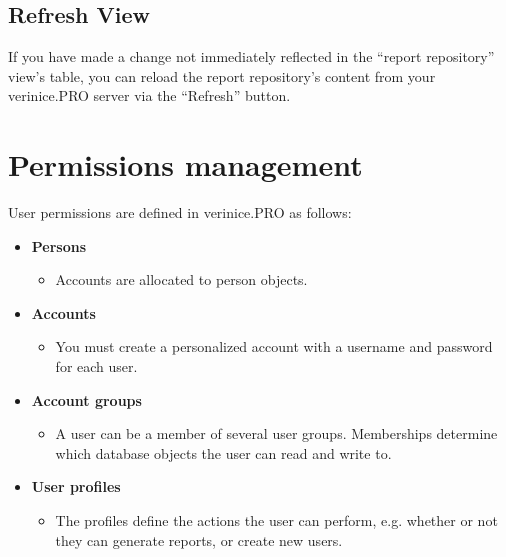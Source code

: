\documentclass[a4paper,10pt]{book}
\begin{document}
\subsection {Refresh View}

If you have made a change not immediately reflected in the ``report
repository'' view's table, you can reload the report repository's
content from your verinice.PRO server via the ``Refresh'' button.

\section{Permissions management} \label{sec:permissions-management}
User permissions are defined in verinice.PRO as follows:
\begin{itemize}
\item \textbf{Persons}
  \begin{itemize}
	\item Accounts are allocated to person objects.
   \end{itemize}
\item \textbf{Accounts}
  \begin{itemize}
   \item You must create a personalized account with a username and password for each user.
  \end{itemize}
\item \textbf{Account groups}
  \begin{itemize}
   \item A user can be a member of several user groups. Memberships determine which database objects the user can read and write to.
  \end{itemize}
\item \textbf{User profiles}
   \begin{itemize}
    \item The profiles define the actions the user can perform, e.g. whether or not they can generate reports, or create new users.
   \end{itemize}
\end{itemize}
\end{document}
